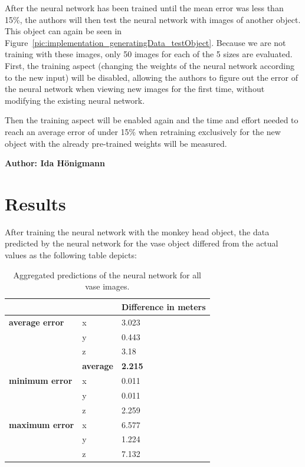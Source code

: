 After the neural network has been trained until the mean error was less than 15\%, the authors will then test the neural network with images of another object. This object can again be seen in Figure~\ref{pic:implementation_generatingData_testObject}. Because we are not training with these images, only 50 images for each of the 5 sizes are evaluated. First, the training aspect (changing the weights of the neural network according to the new input) will be disabled, allowing the authors to figure out the error of the neural network when viewing new images for the first time, without modifying the existing neural network.

Then the training aspect will be enabled again and the time and effort needed to reach an average error of under 15\% when retraining exclusively for the new object with the already pre-trained weights will be measured.

\vspace{5mm}
\noindent
\textbf{Author: Ida Hönigmann}

\section{Results}
After training the neural network with the monkey head object, the data predicted by the neural network for the vase object differed from the actual values as the following table depicts:

\begin{table}[h!]
	\begin{tabular}{ll|l}
		&     & \textbf{Difference in meters} \\
		\hline
		\textbf{average error} & x   & 3.023                         \\
		& y   & 0.443                         \\
		& z   & 3.18                          \\
		& \textbf{average} & \textbf{2.215}                         \\
		\hline
		\textbf{minimum error} & x   & 0.011                         \\
		& y   & 0.011                         \\
		& z   & 2.259                         \\
		\hline
		\textbf{maximum error} & x   & 6.577                         \\
		& y   & 1.224                         \\
		& z   & 7.132                                                  
	\end{tabular}
	\caption{Aggregated predictions of the neural network for all vase images.}
\end{table}

